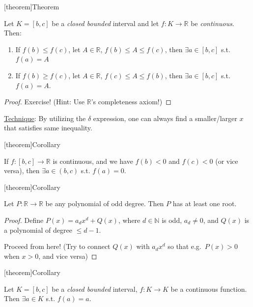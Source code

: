 \documentclass[12pt]{report}
\theoremstyle{definition}
\begin{document}
[theorem]{Theorem}
\begin{intermediate value theorem}
    Let $K = [b,c]$ be a \emph{closed bounded} interval and let $f:K\rightarrow{}\mathbb{R}$
    be \emph{continuous}. Then:
    \begin{enumerate}
        \item If $f(b)\le f(c)$, let $A \in \mathbb{R}$, $f(b) \le A \le f(c)$,
            then $\exists a \in [b,c]$ s.t. $f(a) = A$
        \item If $f(b)\ge f(c)$, let $A \in \mathbb{R}$, $f(c) \le A \le f(b)$,
            then $\exists a \in [b,c]$ s.t. $f(a) = A$.
    \end{enumerate}
\end{intermediate value theorem}

\begin{proof}
    Exercise! (Hint: Use $\mathbb{R}$'s completeness axiom!)
\end{proof}

\underline{Technique}: By utilizing the $\delta$ expression,
one can always find a smaller/larger $x$ that satisfies same inequality.

[theorem]{Corollary}
\begin{coro of IVT}
    If $f:[b,c]\rightarrow{}\mathbb{R}$ is continuous,
    and we have $f(b) < 0$ and $f(c) < 0$ (or vice versa),
    then $\exists a \in (b,c)$ s.t. $f(a) = 0$.
\end{coro of IVT}

[theorem]{Corollary}
\begin{odd degree polynomial has at least one root}
    Let $P:\mathbb{R}\rightarrow{}\mathbb{R}$ be any polynomial of odd degree.
    Then $P$ has at least one root.
\end{odd degree polynomial has at least one root}

\begin{proof}
    Define $P(x) = a_d x^{d} + Q(x)$, where $d \in \mathbb{N}$ is odd, $a_d\neq 0$,
    and $Q(x)$ is a polynomial of degree $\le d - 1$. 

    Proceed from here!
    (Try to connect $Q(x)$ with $a_d x^{d}$ so that e.g.\ $P(x) > 0$ when $x > 0$, and vice versa)
\end{proof}

[theorem]{Corollary}
\begin{closed bounded continuous function has a fixed point}
    Let $K = [b,c]$ be a \emph{closed bounded} interval,
    $f:K\rightarrow{}K$ be a continuous function.
    Then $\exists a \in K$ s.t. $f(a) = a$.
\end{closed bounded continuous function has a fixed point}
\end{document}
